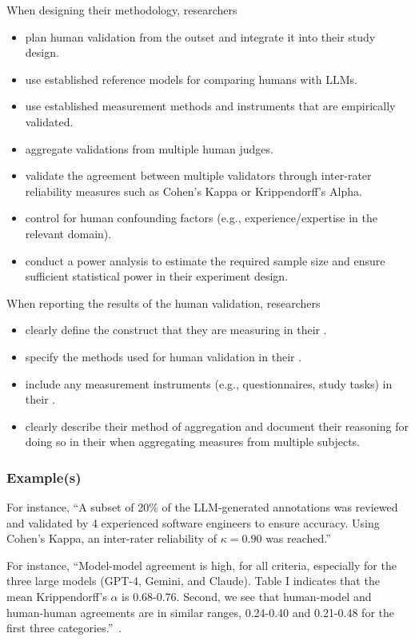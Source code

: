 When designing their methodology, researchers
\begin{itemize}
    \item \should plan human validation from the outset and integrate it into their study design.
    \item \should use established reference models for comparing humans with LLMs.
    \item \should use established measurement methods and instruments that are empirically validated.
    \item \may aggregate validations from multiple human judges.
    \item \should validate the agreement between multiple validators through inter-rater reliability measures such as Cohen's Kappa or Krippendorff's Alpha.
    \item \should control for human confounding factors (e.g., experience/expertise in the relevant domain). 
    \item \should conduct a power analysis to estimate the required sample size and ensure sufficient statistical power in their experiment design.
\end{itemize}

When reporting the results of the human validation, researchers
\begin{itemize}
    \item \must clearly define the construct that they are measuring in their \paper.
    \item \must specify the methods used for human validation in their \paper.
    \item \should include any measurement instruments (e.g., questionnaires, study tasks) in their \supplementarymaterial.
    \item \should clearly describe their method of aggregation and document their reasoning for doing so in their \paper when aggregating measures from multiple subjects.
\end{itemize}

\subsubsection{Example(s)}

For instance, ``A subset of 20\% of the LLM-generated annotations was reviewed and validated by 4 experienced software engineers to ensure accuracy. Using Cohen's Kappa, an inter-rater reliability of $\kappa = 0.90$ was reached.''

For instance, ``Model-model agreement is high, for all criteria, especially for the three large models (GPT-4, Gemini, and Claude). Table I indicates that the mean Krippendorff’s $\alpha$ is 0.68-0.76. 
Second, we see that human-model and human-human agreements are in similar ranges, 0.24-0.40 and 0.21-0.48
for the first three categories.''~\cite{DBLP:journals/corr/abs-2408-05534}.

